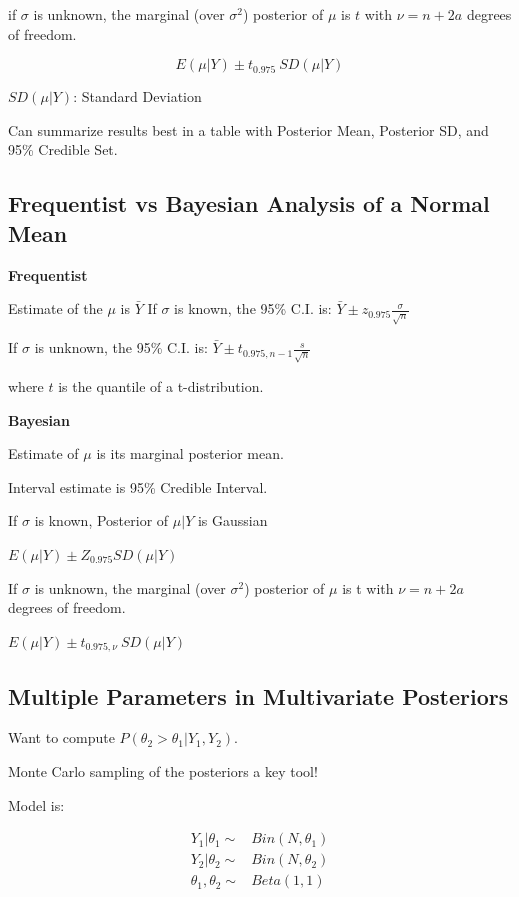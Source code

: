 \documentclass[11pt]{article}
\begin{document}
if \(\sigma\) is unknown, the marginal (over \(\sigma^2\)) posterior of \(\mu\) is \(t\)
with \(\nu = n + 2 a\) degrees of freedom.

$$
E(\mu | Y) \pm t_{0.975} \ SD(\mu | Y)
$$

\(SD(\mu | Y)\): Standard Deviation


Can summarize results best in a table with Posterior Mean, Posterior SD, and 95\%
Credible Set.

\subsection{Frequentist vs Bayesian Analysis of a Normal Mean}
\label{sec:orgec565a4}

\textbf{Frequentist}

Estimate of the \(\mu\) is \(\bar Y\)
If \(\sigma\) is known, the 95\% C.I. is: \(\bar Y \pm z_{0.975} \frac{\sigma}{\sqrt
n}\)

If \(\sigma\) is unknown, the 95\% C.I. is: \(\bar Y \pm t_{0.975, n - 1} \frac{s}{\sqrt{n}}\)

where \(t\) is the quantile of a t-distribution.

\textbf{Bayesian}

Estimate of \(\mu\) is its marginal posterior mean.

Interval estimate is 95\% Credible Interval.

If \(\sigma\) is known, Posterior of \(\mu | Y\) is Gaussian

\(E(\mu | Y) \pm Z_{0.975} SD(\mu | Y)\)

If \(\sigma\) is unknown, the marginal (over \(\sigma^2\)) posterior of \(\mu\) is t
with \(\nu = n + 2a\) degrees of freedom.

\(E(\mu | Y) \pm t_{0.975, \nu} \ SD(\mu | Y)\)

\subsection{Multiple Parameters in Multivariate Posteriors}
\label{sec:orgc7e0c18}

Want to compute \(P(\theta_2 > \theta_1 | Y_1, Y_2)\).

Monte Carlo sampling of the posteriors a key tool!

Model is:

\begin{equation}
\begin{split}
Y_1 | \theta_1 \sim & Bin(N, \theta_1)\\
Y_2 | \theta_2 \sim & Bin(N, \theta_2)\\
\theta_1, \theta_2 \sim & Beta(1,1)
\end{split}
\end{equation}
\end{document}
